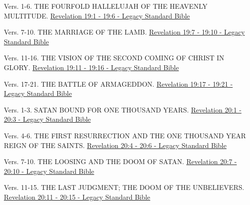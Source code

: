 \documentclass[
  ignorenonframetext,
]{beamer}
\begin{document}
\begin{frame}{19}
\label{section-272}
\begin{block}{Vers. 1-6. THE FOURFOLD HALLELUJAH OF THE HEAVENLY
MULTITUDE.}
\label{vers.-1-6.-the-fourfold-hallelujah-of-the-heavenly-multitude.}
\href{https://read.lsbible.org/?q=rev19\%3A1-6}{Revelation 19:1 - 19:6 -
Legacy Standard Bible}
\end{block}

\begin{block}{Vers. 7-10. THE MARRIAGE OF THE LAMB.}
\label{vers.-7-10.-the-marriage-of-the-lamb.}
\href{https://read.lsbible.org/?q=rev19\%3A7-10}{Revelation 19:7 - 19:10
- Legacy Standard Bible}
\end{block}

\begin{block}{Vers. 11-16. THE VISION OF THE SECOND COMING OF CHRIST IN
GLORY.}
\label{vers.-11-16.-the-vision-of-the-second-coming-of-christ-in-glory.}
\href{https://read.lsbible.org/?q=rev19\%3A11-16}{Revelation 19:11 -
19:16 - Legacy Standard Bible}
\end{block}

\begin{block}{Vers. 17-21. THE BATTLE OF ARMAGEDDON.}
\label{vers.-17-21.-the-battle-of-armageddon.}
\href{https://read.lsbible.org/?q=rev19\%3A17-21}{Revelation 19:17 -
19:21 - Legacy Standard Bible}
\end{block}
\end{frame}

\begin{frame}{20}
\label{section-273}
\begin{block}{Vers. 1-3. SATAN BOUND FOR ONE THOUSAND YEARS.}
\label{vers.-1-3.-satan-bound-for-one-thousand-years.}
\href{https://read.lsbible.org/?q=rev20\%3A1-3}{Revelation 20:1 - 20:3 -
Legacy Standard Bible}
\end{block}

\begin{block}{Vers. 4-6. THE FIRST RESURRECTION AND THE ONE THOUSAND
YEAR REIGN OF THE SAINTS.}
\label{vers.-4-6.-the-first-resurrection-and-the-one-thousand-year-reign-of-the-saints.}
\href{https://read.lsbible.org/?q=rev20\%3A4-6}{Revelation 20:4 - 20:6 -
Legacy Standard Bible}
\end{block}

\begin{block}{Vers. 7-10. THE LOOSING AND THE DOOM OF SATAN.}
\label{vers.-7-10.-the-loosing-and-the-doom-of-satan.}
\href{https://read.lsbible.org/?q=rev20\%3A7-10}{Revelation 20:7 - 20:10
- Legacy Standard Bible}
\end{block}

\begin{block}{Vers. 11-15. THE LAST JUDGMENT; THE DOOM OF THE
UNBELIEVERS.}
\label{vers.-11-15.-the-last-judgment-the-doom-of-the-unbelievers.}
\href{https://read.lsbible.org/?q=rev20\%3A11-15}{Revelation 20:11 -
20:15 - Legacy Standard Bible}
\end{block}
\end{frame}
\end{document}
